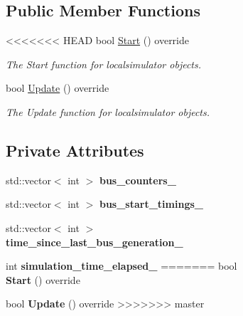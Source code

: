 \begin{figure}[H]
\begin{center}
\begin{figure}[H]
\begin{center}
\subsection*{Public Member Functions}
\begin{DoxyCompactItemize}
\item 
<<<<<<< HEAD
bool \hyperlink{classLocalSimulator_a380634942668855dd1da8276b270b362}{Start} () override
\begin{DoxyCompactList}\small\item\em The Start function for localsimulator objects. \end{DoxyCompactList}\item 
bool \hyperlink{classLocalSimulator_ac98ba1a401ad204dd5169934adb02684}{Update} () override
\begin{DoxyCompactList}\small\item\em The Update function for localsimulator objects. \end{DoxyCompactList}\end{DoxyCompactItemize}
\subsection*{Private Attributes}
\begin{DoxyCompactItemize}
\item 
\mbox{\label{classLocalSimulator_a1c92b8c58df2b015753bd451bc469299}} 
std\+::vector$<$ int $>$ {\bfseries bus\+\_\+counters\+\_\+}
\item 
\mbox{\label{classLocalSimulator_afe5ff08ca4c982f774b6f924e2844689}} 
std\+::vector$<$ int $>$ {\bfseries bus\+\_\+start\+\_\+timings\+\_\+}
\item 
\mbox{\label{classLocalSimulator_a161826601c14be88063cb8b2d1bee552}} 
std\+::vector$<$ int $>$ {\bfseries time\+\_\+since\+\_\+last\+\_\+bus\+\_\+generation\+\_\+}
\item 
\mbox{\label{classLocalSimulator_a1acd308212f56e1d37eca95a2bc5d2f4}} 
int {\bfseries simulation\+\_\+time\+\_\+elapsed\+\_\+}
=======
\mbox{\label{classLocalSimulator_a380634942668855dd1da8276b270b362}} 
bool {\bfseries Start} () override
\item 
\mbox{\label{classLocalSimulator_ac98ba1a401ad204dd5169934adb02684}} 
bool {\bfseries Update} () override
>>>>>>> master
\end{DoxyCompactItemize}

\end{center}
\end{figure}
\end{center}
\end{figure}
